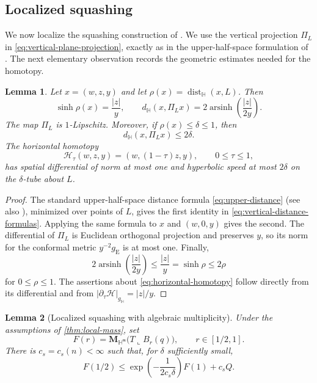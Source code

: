 \documentclass[11pt,reqno]{amsart}
\numberwithin{equation}{section}
\newtheorem{lemma}[lemma]{Lemma}
\theoremstyle{definition}
\theoremstyle{remark}
\newcommand{\Hyp}{\mathbb H}
\newcommand{\Mass}{\mathbf M}
\newcommand{\dist}{\operatorname{dist}}
\newcommand{\restr}{\mathbin{\llcorner}}
\begin{document}
\subsection{Localized squashing}\label{sec:squashing}

We now localize the squashing construction of
\cite[Lemmas~3.1 and~3.2]{JiangXie}.  We use the vertical projection
$\Pi_L$ in \eqref{eq:vertical-plane-projection}, exactly as in the
upper-half-space formulation of \cite{JiangXie}.  The next elementary
observation records the geometric estimates needed for the homotopy.

\begin{lemma}\label{lem:vertical-projection}
Let $x=(w,z,y)$ and let
$\rho(x)=\dist_{\Hyp}(x,L)$.  Then
\begin{equation}\label{eq:vertical-distance-formulas}
 \sinh\rho(x)=\frac{|z|}{y},
 \qquad
 d_{\Hyp}(x,\Pi_Lx)
 =2\operatorname{arsinh}\!\left(\frac{|z|}{2y}\right).
\end{equation}
The map $\Pi_L$ is $1$-Lipschitz.  Moreover, if $\rho(x)\le\delta\le1$,
then
\begin{equation}\label{eq:projection-displacement}
 d_{\Hyp}(x,\Pi_Lx)\le2\delta.
\end{equation}
The horizontal homotopy
\begin{equation}\label{eq:horizontal-homotopy}
 \mathcal H_\tau(w,z,y)=(w,(1-\tau)z,y),
 \qquad 0\le\tau\le1,
\end{equation}
has spatial differential of norm at most one and hyperbolic speed at most
$2\delta$ on the $\delta$-tube about $L$.
\end{lemma}

\begin{proof}
The standard upper-half-space distance formula \eqref{eq:upper-distance}
(see also \cite[Chapter~4]{Ratcliffe}), minimized over points of $L$, gives
the first identity in
\eqref{eq:vertical-distance-formulas}.  Applying the same formula to $x$
 and $(w,0,y)$ gives the second.  The differential of $\Pi_L$ is Euclidean
orthogonal projection and preserves $y$, so its norm for the conformal
metric $y^{-2}g_{\mathrm E}$ is at most one.  Finally,
\[
 2\operatorname{arsinh}\!\left(\frac{|z|}{2y}\right)
 \le\frac{|z|}{y}=\sinh\rho\le2\rho
\]
for $0\le\rho\le1$.  The assertions about \eqref{eq:horizontal-homotopy}
follow directly from its differential and from
 $|\partial_\tau\mathcal H|_{g_{\Hyp}}=|z|/y$.
\end{proof}

\begin{lemma}[Localized squashing with algebraic multiplicity]
\label{lem:squashing}
Under the assumptions of \cref{thm:local-mass}, set
\[
 F(r)=\Mass_{\Hyp^{\mathfrak m}}\bigl(T\restr B_r(q)\bigr),
 \qquad r\in[1/2,1].
\]
There is $c_s=c_s(n)<\infty$ such that, for $\delta$ sufficiently small,
\begin{equation}\label{eq:squashing-integrated}
 F(1/2)
 \le\exp\!\left(-\frac{1}{2c_s\delta}\right)F(1)+c_sQ.
\end{equation}
\end{lemma}
\end{document}
